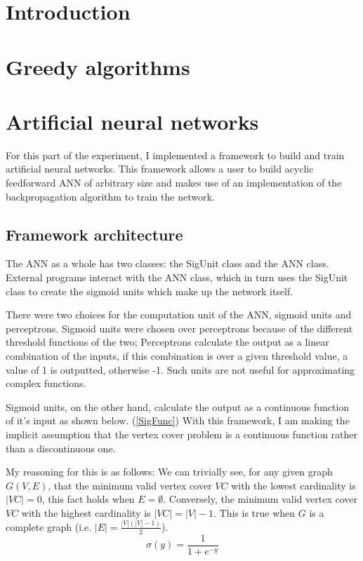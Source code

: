 \documentclass[11pt]{article}
\theoremstyle{definition}
\begin{document}
  \tableofcontents

  \newpage

  \section{Introduction}

  \section{Greedy algorithms}

  \section{Artificial neural networks}
    For this part of the experiment, I implemented a framework to build and train artificial neural networks.
    This framework allows a user to build acyclic feedforward ANN of arbitrary size and makes
    use of an implementation of the backpropagation algorithm to train the network.

    \subsection{Framework architecture}
      The ANN as a whole has two classes: the SigUnit class and the ANN class.
      External programs interact with the ANN class, which in turn uses the SigUnit class to create the
      sigmoid units which make up the network itself.

      There were two choices for the computation unit of the ANN, sigmoid units and perceptrons.
      Sigmoid units were chosen over perceptrons because of the different threshold functions of the two;
      Perceptrons calculate the output as a linear combination of the inputs, if this combination is over a given threshold
      value, a value of 1 is outputted, otherwise -1. Such units are not useful for approximating complex functions.

      Sigmoid units, on the other hand, calculate
      the output as a continuous function of it's input as shown below.\cite{Mitchell.97} (\ref{SigFunc})
      With this framework, I am making the implicit assumption that the vertex cover problem is a
      continuous function rather than a discontinuous one.
     
      My reasoning for this is as follows: We can 
      trivially see, for any given graph $G(V,E)$, that the minimum valid vertex cover $VC$ with
      the lowest cardinality is $\mid VC \mid = 0$, this fact holds when $E = \emptyset$.
      Conversely, the minimum valid vertex cover $VC$ with the highest
      cardinality is $\mid VC \mid = |V|-1$. This is true when $G$ is a complete graph (i.e. $|E|= \frac{|V|(|V|-1)}{2}$).          
      \begin{equation} \label{SigFunc} 
        \sigma(y) = \frac{1}{1+e^{-y}}
      \end{equation}  
\end{document}
